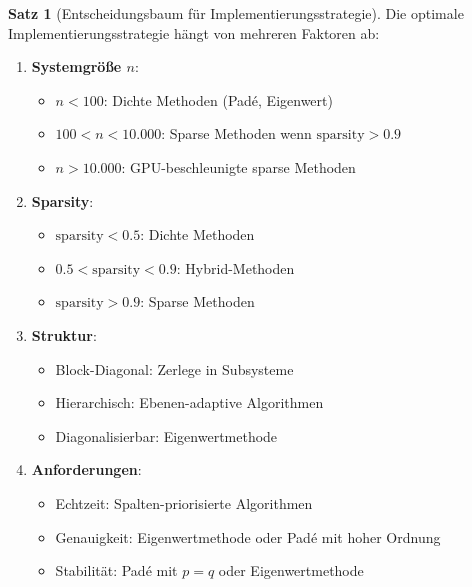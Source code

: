 \documentclass[a4paper,12pt]{report}
\theoremstyle{definition}
\newtheorem{satz}{Satz}
\begin{document}
	\begin{satz}[Entscheidungsbaum für Implementierungsstrategie]
		Die optimale Implementierungsstrategie hängt von mehreren Faktoren ab:
		
		\begin{enumerate}
			\item \textbf{Systemgröße $n$}:
			\begin{itemize}
				\item $n < 100$: Dichte Methoden (Padé, Eigenwert)
				\item $100 < n < 10.000$: Sparse Methoden wenn $\text{sparsity} > 0.9$
				\item $n > 10.000$: GPU-beschleunigte sparse Methoden
			\end{itemize}
			
			\item \textbf{Sparsity}:
			\begin{itemize}
				\item $\text{sparsity} < 0.5$: Dichte Methoden
				\item $0.5 < \text{sparsity} < 0.9$: Hybrid-Methoden
				\item $\text{sparsity} > 0.9$: Sparse Methoden
			\end{itemize}
			
			\item \textbf{Struktur}:
			\begin{itemize}
				\item Block-Diagonal: Zerlege in Subsysteme
				\item Hierarchisch: Ebenen-adaptive Algorithmen
				\item Diagonalisierbar: Eigenwertmethode
			\end{itemize}
			
			\item \textbf{Anforderungen}:
			\begin{itemize}
				\item Echtzeit: Spalten-priorisierte Algorithmen
				\item Genauigkeit: Eigenwertmethode oder Padé mit hoher Ordnung
				\item Stabilität: Padé mit $p = q$ oder Eigenwertmethode
			\end{itemize}
		\end{enumerate}
	\end{satz}
	
\end{document}
